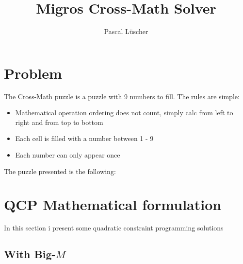 \documentclass[parskip=half]{scrartcl}
\title{Migros Cross-Math Solver}
\author{Pascal Lüscher}
\newcommand{\rect}[4]{\draw[fill=#4] (#1 cm, #2 cm) rectangle (#1 cm + 1 cm, #2 cm - 1 cm) node[pos=.5] {#3};}
\newcommand{\wsq}[3]{\rect{#1}{#2}{#3}{white}}
\newcommand{\bsq}[2]{\rect{#1}{#2}{}{gray}}
\newcommand{\ysq}[2]{\rect{#1}{#2}{}{yellow!10}}
\begin{document}
\maketitle

\section{Problem}
The Cross-Math puzzle is a puzzle with 9 numbers to fill.
The rules are simple:
\begin{itemize}
	\item Mathematical operation ordering does not count, simply calc from left to right and from top to bottom
	\item Each cell is filled with a number between 1 - 9
	\item Each number can only appear once
\end{itemize}

The puzzle presented is the following:
\begin{center}
\end{center}


\section{QCP Mathematical formulation}
In this section i present some quadratic constraint programming solutions
\subsection{With Big-$M$}
\end{document}
